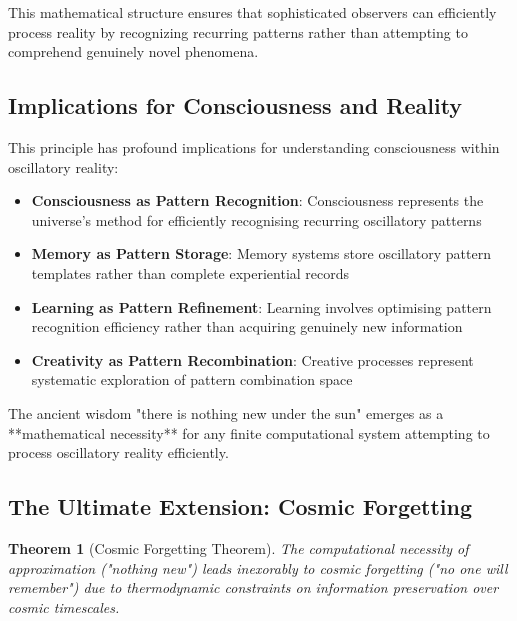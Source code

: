 \documentclass[11pt]{article}
\newtheorem{theorem}{Theorem}[section]
\theoremstyle{remark}
\begin{document}
This mathematical structure ensures that sophisticated observers can efficiently process reality by recognizing recurring patterns rather than attempting to comprehend genuinely novel phenomena.

\subsection{Implications for Consciousness and Reality}

This principle has profound implications for understanding consciousness within oscillatory reality:

\begin{itemize}
\item \textbf{Consciousness as Pattern Recognition}: Consciousness represents the universe's method for efficiently recognising recurring oscillatory patterns
\item \textbf{Memory as Pattern Storage}: Memory systems store oscillatory pattern templates rather than complete experiential records
\item \textbf{Learning as Pattern Refinement}: Learning involves optimising pattern recognition efficiency rather than acquiring genuinely new information
\item \textbf{Creativity as Pattern Recombination}: Creative processes represent systematic exploration of pattern combination space
\end{itemize}

The ancient wisdom "there is nothing new under the sun" emerges as a **mathematical necessity** for any finite computational system attempting to process oscillatory reality efficiently.

\subsection{The Ultimate Extension: Cosmic Forgetting}

\begin{theorem}[Cosmic Forgetting Theorem]
The computational necessity of approximation ("nothing new") leads inexorably to cosmic forgetting ("no one will remember") due to thermodynamic constraints on information preservation over cosmic timescales.
\end{theorem}
\end{document}
